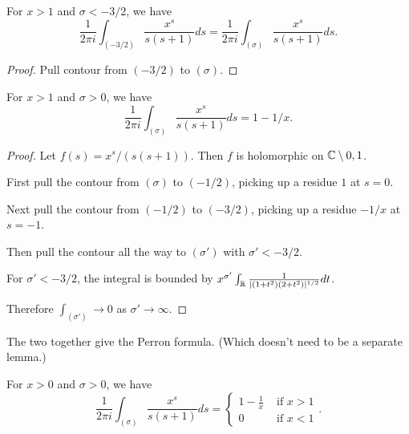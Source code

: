 \begin{lemma}[contourPull3]\label{contourPull3}\leanok
For $x>1$ and $\sigma<-3/2$, we have
$$
\frac1{2\pi i}
\int_{(-3/2)}\frac{x^s}{s(s+1)}ds = \frac 1{2\pi i}
\int_{(\sigma)}\frac{x^s}{s(s+1)}ds.
$$
\end{lemma}


\begin{proof}\leanok
Pull contour from $(-3/2)$ to $(\sigma)$.
\end{proof}


\begin{lemma}[formulaGtOne]\label{formulaGtOne}\leanok
For $x>1$ and $\sigma>0$, we have
$$
\frac1{2\pi i}
\int_{(\sigma)}\frac{x^s}{s(s+1)}ds =1-1/x.
$$
\end{lemma}


\begin{proof}\leanok
{}
  Let $f(s) = x^s/(s(s+1))$. Then $f$ is holomorphic on $\C \setminus {0,1}$.

 First pull the contour from $(\sigma)$ to $(-1/2)$, picking up a residue $1$ at $s=0$.

 Next pull the contour from $(-1/2)$ to $(-3/2)$, picking up a residue $-1/x$ at $s=-1$.

 Then pull the contour all the way to $(\sigma')$ with $\sigma'<-3/2$.

 For $\sigma' < -3/2$, the integral is bounded by $x^{\sigma'}\int_\R\frac{1}{|(1+t^2)(2+t^2)|^{1/2}}dt$.

 Therefore $\int_{(\sigma')}\to 0$ as $\sigma'\to\infty$.


\end{proof}


The two together give the Perron formula. (Which doesn't need to be a separate lemma.)

For $x>0$ and $\sigma>0$, we have
$$
\frac1{2\pi i}
\int_{(\sigma)}\frac{x^s}{s(s+1)}ds = \begin{cases}
1-\frac1x & \text{ if }x>1\\
0 & \text{ if } x<1
\end{cases}.
$$

